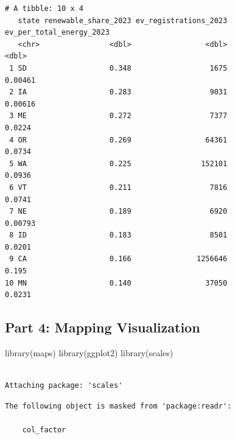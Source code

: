 \documentclass[
  letterpaper,
  DIV=11,
  numbers=noendperiod]{scrartcl}
\newenvironment{Shaded}{\begin{snugshade}}{\end{snugshade}}
\newcommand{\FunctionTok}[1]{\textcolor[rgb]{0.28,0.35,0.67}{#1}}
\newcommand{\NormalTok}[1]{\textcolor[rgb]{0.00,0.23,0.31}{#1}}
\begin{document}
\begin{verbatim}
# A tibble: 10 x 4
   state renewable_share_2023 ev_registrations_2023 ev_per_total_energy_2023
   <chr>                <dbl>                 <dbl>                    <dbl>
 1 SD                   0.348                  1675                  0.00461
 2 IA                   0.283                  9031                  0.00616
 3 ME                   0.272                  7377                  0.0224 
 4 OR                   0.269                 64361                  0.0734 
 5 WA                   0.225                152101                  0.0936 
 6 VT                   0.211                  7816                  0.0741 
 7 NE                   0.189                  6920                  0.00793
 8 ID                   0.183                  8501                  0.0201 
 9 CA                   0.166               1256646                  0.195  
10 MN                   0.140                 37050                  0.0231 
\end{verbatim}

\subsection{\texorpdfstring{\textbf{Part 4: Mapping
Visualization}}{Part 4: Mapping Visualization}}\label{part-4-mapping-visualization}

\begin{Shaded}
\begin{Highlighting}[]
\FunctionTok{library}\NormalTok{(maps)}
\FunctionTok{library}\NormalTok{(ggplot2)}
\FunctionTok{library}\NormalTok{(scales)}
\end{Highlighting}
\end{Shaded}

\begin{verbatim}

Attaching package: 'scales'
\end{verbatim}

\begin{verbatim}
The following object is masked from 'package:readr':

    col_factor
\end{verbatim}
\end{document}

